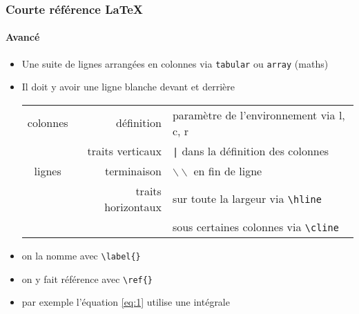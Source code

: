 
\begin{frame}[fragile]
  \frametitle{Courte référence \LaTeX{}}
  \framesubtitle{Avancé}


  \begin{itemize}
  \item Une suite de lignes arrangées en colonnes via \verb|tabular| ou \verb|array| (maths)
  \item Il doit y avoir une ligne blanche devant et derrière
    
    \begin{tabular}{|c|r|l|}
      \firsthline
      colonnes & définition         & paramètre de l'environnement via l, c, r  \\ \cline{2-3}
               & traits verticaux   & \verb!|! dans la définition des colonnes  \\ \hline
      lignes   & terminaison        & $\backslash\backslash$ en fin de ligne    \\ \cline{2-3}
               & traits horizontaux & sur toute la largeur via \verb|\hline|    \\ \cline{2-3}
               &                    & sous certaines colonnes via \verb|\cline| \\ \hline
    \end{tabular}
  \end{itemize}


  \begin{itemize}
  \item on la nomme avec \verb|\label{}|
  \item on y fait référence avec \verb|\ref{}|
  \item par exemple l'équation \ref{eq:1} utilise une intégrale
  \end{itemize}
\end{frame}


